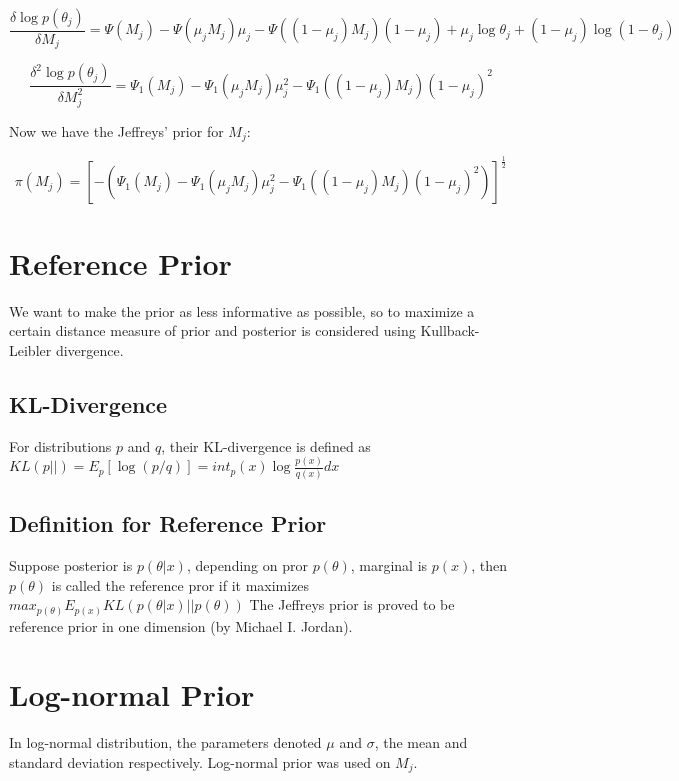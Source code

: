 \documentclass[11pt,reqno]{amsart}
\begin{document}
\begin{equation}
\frac{\delta\log p(\theta_{j})}{\delta M_{j}} = \Psi(M_{j}) - \Psi(\mu_{j} M_{j})\mu_{j} - \Psi((1-\mu_{j})M_{j})(1-\mu_{j}) +\mu_{j}\log\theta_{j} + (1-\mu_{j})\log(1-\theta_{j})
\end{equation}

\begin{equation}
\frac{\delta^{2}\log p(\theta_{j})}{\delta M_{j}^{2}}  = \Psi_{1}(M_{j}) - \Psi_{1}(\mu_{j} M_{j})\mu_{j}^{2} - \Psi_{1}((1-\mu_{j})M_{j})(1-\mu_{j})^{2}
\end{equation}

Now we have the Jeffreys' prior for $M_{j}$:

\begin{equation}
\pi\left({M}_{j}\right) = [-\left(\Psi_{1}(M_{j}) - \Psi_{1}(\mu_{j} M_{j})\mu_{j}^{2} - \Psi_{1}((1-\mu_{j})M_{j}){(1-\mu_{j})^{2}}\right)]^{\frac{1}{2}}
\end{equation}


\section{Reference Prior}
We want to make the prior as less informative as possible, so to maximize a certain distance measure of prior and posterior is considered using Kullback-Leibler divergence.

\subsection{KL-Divergence}
For distributions $p$ and $q$, their KL-divergence is defined as $KL\left(p||\right) = E_p[\log\left(p/q\right)] = int_p\left(x\right)\log \frac{p\left(x\right)}{q\left(x\right)}dx$

\subsection{Definition for Reference Prior}
Suppose posterior is $p\left(\theta | x \right)$, depending on pror $p\left(\theta \right)$, marginal is $p\left(x \right)$, then $p\left(\theta \right)$ is called the reference pror if it maximizes $max_{p\left(\theta\right)}E_{p\left(x\right)}KL\left(p\left(\theta|x\right)||p\left(\theta\right)\right)$
The Jeffreys prior is proved to be reference prior in one dimension (by Michael I. Jordan).


\section{Log-normal Prior}
In log-normal distribution, the parameters denoted $\mu$ and $\sigma$, the mean and standard deviation respectively. Log-normal prior was used on $ M_{j}$.
\end{document}
